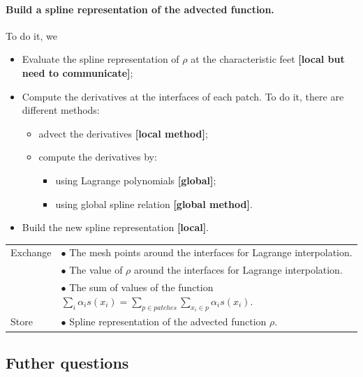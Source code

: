 \documentclass[presentation.tex]{subfiles}
\begin{document}
\paragraph{Build a spline representation of the advected function.}
To do it, we 
\begin{itemize}
	\item Evaluate the spline representation of $\rho$ at the characteristic feet \textbf{[local but need to communicate]}; 
	\item Compute the derivatives at the interfaces of each patch. To do it, there are different methods: 
	\begin{itemize}
		\item advect the derivatives \textbf{[local method]}; 
		\item compute the derivatives by: 
		\begin{itemize}
			\item using Lagrange polynomials \textbf{[global]}; 
			\item using global spline relation \textbf{[global method]}. 
		\end{itemize}
	\end{itemize}
	\item Build the new spline representation \textbf{[local]}.
\end{itemize}


\begin{center}
\begin{tabular}{ |l|l| } 
 \hline
 Exchange 	&  $\bullet$ The mesh points around the interfaces for Lagrange interpolation. \\
 			&  $\bullet$ The value of $\rho$ around the interfaces for Lagrange interpolation. \\
 		 	&  $\bullet$ The sum of values of the function $\sum_i \alpha_i s(x_i) = \sum_{p \in patches}\sum_{x_i\in p} \alpha_i s(x_i)$. \\
 \hline
 Store 	& $\bullet$ Spline representation of the advected function $\rho$. \\
 \hline
\end{tabular}
\end{center}




\subsection{Futher questions}
\end{document}

